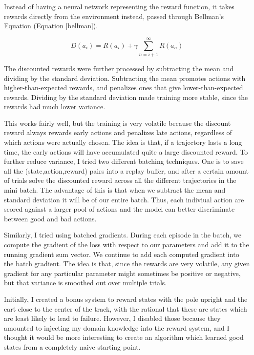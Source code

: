 \documentclass[12pt,a4paper]{article}
\begin{document}
Instead of having a neural network representing the reward function, it takes rewards directly from the environment instead, passed through Bellman's Equation (Equation \ref{bellman}).

\begin{equation}\label{bellman}
D(a_i) = R(a_i) + \gamma \sum_{n=i+1}^{\infty}{R(a_n)} 
\end{equation}

The discounted rewards were further processed by subtracting the mean and dividing by the standard deviation. Subtracting the mean promotes actions with higher-than-expected rewards, and penalizes ones that give lower-than-expected rewards. Dividing by the standard deviation made training more stable, since the rewards had much lower variance.

This works fairly well, but the training is very volatile because the discount reward always rewards early actions and penalizes late actions, regardless of which actions were actually chosen. The idea is that, if a trajectory lasts a long time, the early actions will have accumulated quite a large discounted reward. To further reduce variance, I tried two different batching techniques. One is to save all the (state,action,reward) pairs into a replay buffer, and after a certain amount of trials solve the discounted reward across all the different trajectories in the mini batch. The advantage of this is that when we subtract the mean and standard deviation it will be of our entire batch. Thus, each indiviual action are scored against a larger pool of actions and the model can better discriminate between good and bad actions.

Similarly, I tried using batched gradients. During each episode in the batch, we compute the gradient of the loss with respect to our parameters and add it to the running gradient sum vector. We continue to add each computed gradient into the batch gradient. The idea is that, since the rewards are very volatile, any given gradient for any particular parameter might sometimes be positive or negative, but that variance is smoothed out over multiple trials.

Initially, I created a bonus system to reward states with the pole upright and the cart close to the center of the track, with the rational that these are states which are least likely to lead to failure. However, I disabled those because they amounted to injecting my domain knowledge into the reward system, and I thought it would be more interesting to create an algorithm which learned good states from a completely naive starting point.
\end{document}
